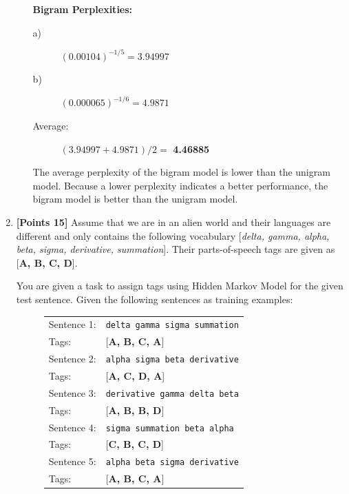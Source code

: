\documentclass[12pt]{article}
\begin{document}
\begin{enumerate}
\begin{enumerate}
                  \textbf{Bigram Perplexities:}
                  \begin{description}
                      \item[a)] $(0.00104)^{-1/5} = 3.94997$
                      \item[b)] $(0.000065)^{-1/6} = 4.9871$
                      \item[Average:] $(3.94997 + 4.9871)/2 =$ \textbf{4.46885}
                  \end{description}

                  The average perplexity of the bigram model is lower than the
                  unigram model. Because a lower perplexity indicates a better
                  performance, the bigram model is better than the unigram
                  model.
          \end{enumerate}

          \newpage
    \item \textbf{[Points 15]}  Assume that we are in an alien world and their
          languages are different and only contains the following vocabulary
              [\textit{delta, gamma, alpha, beta, sigma, derivative, summation}].
          Their parts-of-speech tags are given as [\textbf{A, B, C, D}].

          You are given a task to assign tags using Hidden Markov Model for the
          given test sentence. Given the following sentences as training
          examples:

          \begin{figure}[h]
              \centering
              \begin{tabular}{l|l}
                  \hline
                  Sentence 1: & \verb/delta gamma sigma summation/ \\
                  Tags:       & [\textbf{A, B, C, A}]   \\
                  \hline
                  Sentence 2: & \verb/alpha sigma beta derivative/ \\
                  Tags:       & [\textbf{A, C, D, A}]   \\
                  \hline
                  Sentence 3: & \verb/derivative gamma delta beta/ \\
                  Tags:       & [\textbf{A, B, B, D}]   \\
                  \hline
                  Sentence 4: & \verb/sigma summation beta alpha/ \\
                  Tags:       & [\textbf{C, B, C, D}]   \\
                  \hline
                  Sentence 5: & \verb/alpha beta sigma derivative/ \\
                  Tags:       & [\textbf{A, B, C, A}]   \\
              \end{tabular}
          \end{figure}


\end{enumerate}
\end{document}
